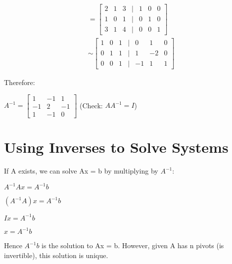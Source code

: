 \documentclass[12pt,a4paper]{article}
\begin{document}
\begin{align*}
[A|I] &= \begin{bmatrix} 
2 & 1 & 3 & | & 1 & 0 & 0 \\
1 & 0 & 1 & | & 0 & 1 & 0 \\
3 & 1 & 4 & | & 0 & 0 & 1
\end{bmatrix} \\[10pt]
&\sim \begin{bmatrix}
1 & 0 & 1 & | & 0 & 1 & 0 \\
0 & 1 & 1 & | & 1 & -2 & 0 \\
0 & 0 & 1 & | & -1 & 1 & 1
\end{bmatrix}
\end{align*}

Therefore:

\begin{center}
$A^{-1} = \begin{bmatrix} 1 & -1 & 1 \\ -1 & 2 & -1 \\ 1 & -1 & 0 \end{bmatrix}$ (Check: $AA^{-1} = I$)
\end{center}

\section{Using Inverses to Solve Systems}

If A exists, we can solve Ax = b by multiplying by $A^{-1}$:

\begin{center}
$A^{-1}Ax = A^{-1}b$
\end{center}

$(A^{-1}A)x = A^{-1}b$

$Ix = A^{-1}b$

$x = A^{-1}b$

Hence $A^{-1}b$ is the solution to Ax = b. However, given A has n pivots (is invertible), this solution is unique.
\end{document}
